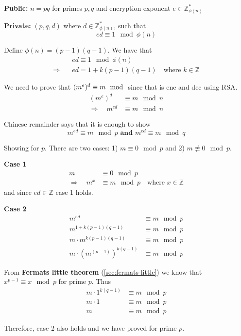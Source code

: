 
\textbf{Public:} $n = pq$ for primes $p, q$ and encryption exponent $e
\in \mathbb{Z}_{\phi(n)}^*$

\textbf{Private:} $(p, q, d)$ where $d \in \mathbb{Z}_{\phi(n)}^*$, such that
\[ ed \equiv 1 \mod \phi(n) \]

Define $\phi(n) = (p-1)(q-1)$. We have that
\begin{align*}
  & ed \equiv 1 \mod \phi(n)\\
  \Rightarrow\quad& ed = 1 + k(p - 1)(q - 1) \quad \text{where } k \in \mathbb{Z}
\end{align*}

We need to prove that $(m^e)^d \equiv m \mod$ since that is enc and dec using RSA.
\begin{align*}
(m^e)^d &\equiv m \mod n \\
\Rightarrow\quad m^{ed} &\equiv m \mod n
\end{align*}

Chinese remainder says that it is enough to show
\[ m^{ed} \equiv m \mod p \textbf{ and } m^{ed} \equiv m \mod q \]

Showing for $p$. There are two cases: 1) $m \equiv 0 \mod p$ and 2) $m \not\equiv 0 \mod p$.

\textbf{Case 1}
\begin{align*}
m &\equiv 0 \mod p\\
\Rightarrow\quad m^x &\equiv m \mod p \quad \text{where } x \in \mathbb{Z}
\end{align*}
and since $ed \in \mathbb{Z}$ case 1 holds.

\textbf{Case 2}
\begin{align*}
m^{ed} &\equiv m \mod p\\
m^{1 + k(p-1)(q-1)} &\equiv m \mod p\\
m \cdot m^{k(p-1)(q-1)} &\equiv m \mod p\\
m \cdot (m^{(p-1)})^{k(q-1)} &\equiv m \mod p
\end{align*}

From \textbf{Fermats little theorem} (\ref{sec:fermats-little}) we
know that $x^{p-1} \equiv x \mod p$ for prime $p$. Thus
\begin{align*}
m \cdot 1^{k(q-1)} &\equiv m \mod p\\
m \cdot 1 &\equiv m \mod p\\
m &\equiv m \mod p
\end{align*}

Therefore, case 2 also holds and we have proved for prime $p$.
